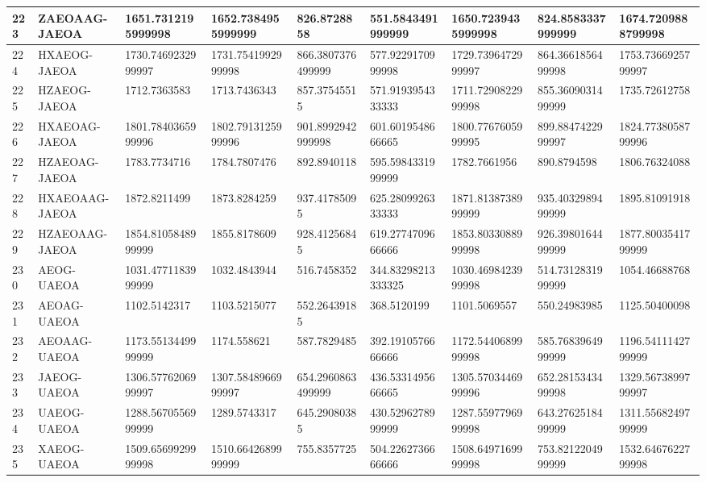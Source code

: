 {\begin{longtable}{|l|l|l|l|l|l|l|l|l|}
        223 & ZAEOAAG-JAEOA & 1651.7312195999998 & 1652.7384955999999 & 826.8728858 & 551.5843491999999 & 1650.7239435999998 & 824.8583337999999 & 1674.7209888799998 \\ \hline
        224 & HXAEOG-JAEOA & 1730.7469232999997 & 1731.7541992999998 & 866.3807376499999 & 577.9229170999998 & 1729.7396472999997 & 864.3661856499998 & 1753.7366925799997 \\ \hline
        225 & HZAEOG-JAEOA & 1712.7363583 & 1713.7436343 & 857.37545515 & 571.9193954333333 & 1711.7290822999998 & 855.3609031499999 & 1735.72612758 \\ \hline
        226 & HXAEOAG-JAEOA & 1801.7840365999996 & 1802.7913125999996 & 901.8992942999998 & 601.6019548666665 & 1800.7767605999995 & 899.8847422999997 & 1824.7738058799996 \\ \hline
        227 & HZAEOAG-JAEOA & 1783.7734716 & 1784.7807476 & 892.8940118 & 595.5984331999999 & 1782.7661956 & 890.8794598 & 1806.76324088 \\ \hline
        228 & HXAEOAAG-JAEOA & 1872.8211499 & 1873.8284259 & 937.41785095 & 625.2809926333333 & 1871.8138738999999 & 935.4032989499999 & 1895.81091918 \\ \hline
        229 & HZAEOAAG-JAEOA & 1854.8105848999999 & 1855.8178609 & 928.41256845 & 619.2774709666666 & 1853.8033088999998 & 926.3980164499999 & 1877.8003541799999 \\ \hline
        230 & AEOG-UAEOA & 1031.4771183999999 & 1032.4843944 & 516.7458352 & 344.83298213333325 & 1030.4698423999998 & 514.7312831999999 & 1054.46688768 \\ \hline
        231 & AEOAG-UAEOA & 1102.5142317 & 1103.5215077 & 552.26439185 & 368.5120199 & 1101.5069557 & 550.24983985 & 1125.50400098 \\ \hline
        232 & AEOAAG-UAEOA & 1173.5513449999999 & 1174.558621 & 587.7829485 & 392.1910576666666 & 1172.5440689999998 & 585.7683964999999 & 1196.5411142799999 \\ \hline
        233 & JAEOG-UAEOA & 1306.5776206999997 & 1307.5848966999997 & 654.2960863499999 & 436.5331495666665 & 1305.5703446999996 & 652.2815343499998 & 1329.5673899799997 \\ \hline
        234 & UAEOG-UAEOA & 1288.5670556999999 & 1289.5743317 & 645.29080385 & 430.5296278999999 & 1287.5597796999998 & 643.2762518499999 & 1311.5568249799999 \\ \hline
        235 & XAEOG-UAEOA & 1509.6569929999998 & 1510.6642689999999 & 755.8357725 & 504.2262736666666 & 1508.6497169999998 & 753.8212204999999 & 1532.6467622799998 \\ \hline

\end{longtable}}
